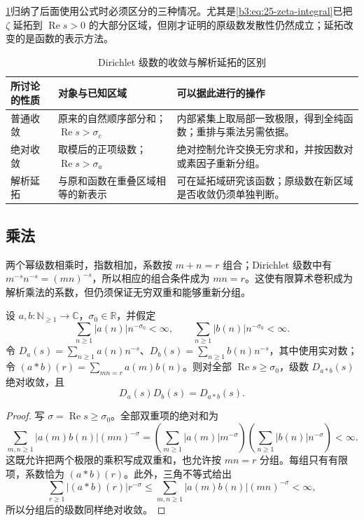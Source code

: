 \cref{b3:tab:25-convergence-meanings}归纳了后面使用公式时必须区分的三种情况。尤其是\eqref{b3:eq:25-zeta-integral}已把 \(\zeta\) 延拓到 \(\operatorname{Re}s>0\) 的大部分区域，但刚才证明的原级数发散性仍然成立；延拓改变的是函数的表示方法。

\begin{table}[htbp]
\centering
\caption{Dirichlet 级数的收敛与解析延拓的区别}
\label{b3:tab:25-convergence-meanings}
\begin{tabularx}{\linewidth}{@{}>{\raggedright\arraybackslash}p{5.8em}>{\raggedright\arraybackslash}p{10.8em}>{\raggedright\arraybackslash}X@{}}
\toprule
所讨论的性质 & 对象与已知区域 & 可以据此进行的操作\\
\midrule
普通收敛 & 原来的自然顺序部分和；\(\operatorname{Re}s>\sigma_c\) & 内部紧集上取局部一致极限，得到全纯函数；重排与乘法另需依据。\\
绝对收敛 & 取模后的正项级数；\(\operatorname{Re}s>\sigma_a\) & 绝对控制允许交换无穷求和，并按因数对或素因子重新分组。\\
解析延拓 & 与原和函数在重叠区域相等的新表示 & 可在延拓域研究该函数；原级数在新区域是否收敛仍须单独判断。\\
\bottomrule
\end{tabularx}
\end{table}

\subsection{乘法}
\label{b3:subsec:250403}

两个幂级数相乘时，指数相加，系数按 \(m+n=r\) 组合；Dirichlet 级数中有 \(m^{-s}n^{-s}=(mn)^{-s}\)，所以相应的组合条件成为 \(mn=r\)。这使有限算术卷积成为解析乘法的系数，但仍须保证无穷双重和能够重新分组。

\begin{proposition}[绝对收敛级数的乘法]\label{b3:prop:25-product-series}
设 \(a,b:\mathbb N_{\ge1}\to\mathbb C\)，\(\sigma_0\in\mathbb R\)，并假定
\[
 \sum_{n\ge1}|a(n)|n^{-\sigma_0}<\infty,
 \qquad\sum_{n\ge1}|b(n)|n^{-\sigma_0}<\infty.
\]
令 \(D_a(s)=\sum_{n\ge1}a(n)n^{-s}\)、\(D_b(s)=\sum_{n\ge1}b(n)n^{-s}\)，其中使用实对数；令 \((a*b)(r)=\sum_{mn=r}a(m)b(n)\)。则对全部 \(\operatorname{Re}s\ge\sigma_0\)，级数 \(D_{a*b}(s)\) 绝对收敛，且
\begin{equation}\label{b3:eq:25-series-convolution}
 D_a(s)D_b(s)=D_{a*b}(s).
\end{equation}
\end{proposition}
\begin{proof}
写 \(\sigma=\operatorname{Re}s\ge\sigma_0\)。全部双重项的绝对和为
\[
 \sum_{m,n\ge1}|a(m)b(n)|(mn)^{-\sigma}
 =\left(\sum_{m\ge1}|a(m)|m^{-\sigma}\right)
  \left(\sum_{n\ge1}|b(n)|n^{-\sigma}\right)<\infty.
\]
这既允许把两个极限的乘积写成双重和，也允许按 \(mn=r\) 分组。每组只有有限项，系数恰为 \((a*b)(r)\)。此外，三角不等式给出
\[
 \sum_{r\ge1}|(a*b)(r)|r^{-\sigma}
 \le\sum_{m,n\ge1}|a(m)b(n)|(mn)^{-\sigma}<\infty,
\]
所以分组后的级数同样绝对收敛。
\end{proof}

